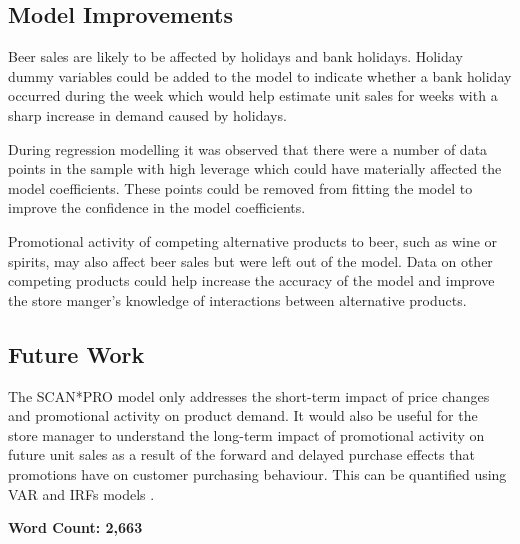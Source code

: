 \documentclass[a4paper,11pt]{article}
\begin{document}
\subsection{Model Improvements}
Beer sales are likely to be affected by holidays and bank holidays. Holiday dummy variables could be added to the model to indicate whether a bank holiday occurred during the week which would help estimate unit sales for weeks with a sharp increase in demand caused by holidays.

During regression modelling it was observed that there were a number of data points in the sample with high leverage which could have materially affected the model coefficients. These points could be removed from fitting the model to improve the confidence in the model coefficients. 

Promotional activity of competing alternative products to beer, such as wine or spirits, may also affect beer sales but were left out of the model. Data on other competing products could help increase the accuracy of the model and improve the store manger's knowledge of interactions between alternative products.

\subsection{Future Work}
The SCAN*PRO model only addresses the short-term impact of price changes and promotional activity on product demand. It would also be useful for the store manager to understand the long-term impact of promotional activity on future unit sales as a result of the forward and delayed purchase effects that promotions have on customer purchasing behaviour. This can be quantified using VAR and IRFs models \citep{srinivasan_promotions_2004}.  


\textbf{Word Count: 2,663}



\end{document}
